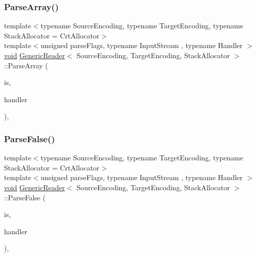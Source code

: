 \subsubsection{\texorpdfstring{Parse\+Array()}{ParseArray()}}
{\footnotesize\ttfamily template$<$typename Source\+Encoding, typename Target\+Encoding, typename Stack\+Allocator = Crt\+Allocator$>$ \\
template$<$unsigned parse\+Flags, typename Input\+Stream , typename Handler $>$ \\
\hyperlink{imgui__impl__opengl3__loader_8h_ac668e7cffd9e2e9cfee428b9b2f34fa7}{void} \hyperlink{classGenericReader}{Generic\+Reader}$<$ Source\+Encoding, Target\+Encoding, Stack\+Allocator $>$\+::Parse\+Array (\begin{DoxyParamCaption}\item[{Input\+Stream \&}]{is,  }\item[{Handler \&}]{handler }\end{DoxyParamCaption})\hspace{0.3cm}{\ttfamily [inline]}, {\ttfamily [private]}}

\mbox{\label{classGenericReader_af3af2d4e8efa1b8ef2f0bb281d8f0540}} 
\subsubsection{\texorpdfstring{Parse\+False()}{ParseFalse()}}
{\footnotesize\ttfamily template$<$typename Source\+Encoding, typename Target\+Encoding, typename Stack\+Allocator = Crt\+Allocator$>$ \\
template$<$unsigned parse\+Flags, typename Input\+Stream , typename Handler $>$ \\
\hyperlink{imgui__impl__opengl3__loader_8h_ac668e7cffd9e2e9cfee428b9b2f34fa7}{void} \hyperlink{classGenericReader}{Generic\+Reader}$<$ Source\+Encoding, Target\+Encoding, Stack\+Allocator $>$\+::Parse\+False (\begin{DoxyParamCaption}\item[{Input\+Stream \&}]{is,  }\item[{Handler \&}]{handler }\end{DoxyParamCaption})\hspace{0.3cm}{\ttfamily [inline]}, {\ttfamily [private]}}

\mbox{\label{classGenericReader_afc44000d3b4d538080b09c6a43c00f20}} 

